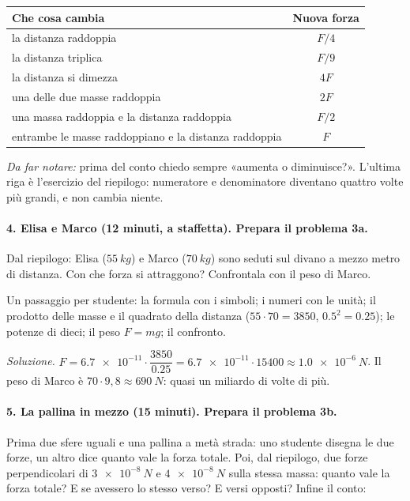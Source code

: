 \documentclass[11pt]{report}
\begin{document}
\begin{center}
\begin{tabular}{lc}
  \toprule
  Che cosa cambia & Nuova forza \\
  \midrule
  la distanza raddoppia & $F/4$ \\
  la distanza triplica & $F/9$ \\
  la distanza si dimezza & $4F$ \\
  una delle due masse raddoppia & $2F$ \\
  una massa raddoppia e la distanza raddoppia & $F/2$ \\
  entrambe le masse raddoppiano e la distanza raddoppia & $F$ \\
  \bottomrule
\end{tabular}
\end{center}

\emph{Da far notare:} prima del conto chiedo sempre «aumenta o
diminuisce?». L'ultima riga è l'esercizio del riepilogo: numeratore e
denominatore diventano quattro volte più grandi, e non cambia niente.

\paragraph{4. Elisa e Marco (12 minuti, a staffetta). Prepara il problema 3a.}
Dal riepilogo: Elisa ($\SI{55}{kg}$) e Marco ($\SI{70}{kg}$) sono seduti
sul divano a mezzo metro di distanza. Con che forza si attraggono?
Confrontala con il peso di Marco.

Un passaggio per studente: la formula con i simboli; i numeri con le
unità; il prodotto delle masse e il quadrato della distanza
($55 \cdot 70 = 3850$, $\num{0.5}^2 = \num{0.25}$); le potenze di dieci;
il peso $F = mg$; il confronto.

\emph{Soluzione.} $F = \num{6.7e-11} \cdot \dfrac{3850}{\num{0.25}} =
\num{6.7e-11} \cdot 15400 \approx \SI{1.0e-6}{N}$. Il peso di Marco è
$70 \cdot 9{,}8 \approx \SI{690}{N}$: quasi un miliardo di volte di più.

\paragraph{5. La pallina in mezzo (15 minuti). Prepara il problema 3b.}
Prima due sfere uguali e una pallina a metà strada: uno studente disegna
le due forze, un altro dice quanto vale la forza totale. Poi, dal
riepilogo, due forze perpendicolari di $\SI{3e-8}{N}$ e $\SI{4e-8}{N}$
sulla stessa massa: quanto vale la forza totale? E se avessero lo stesso
verso? E versi opposti? Infine il conto:
\end{document}
